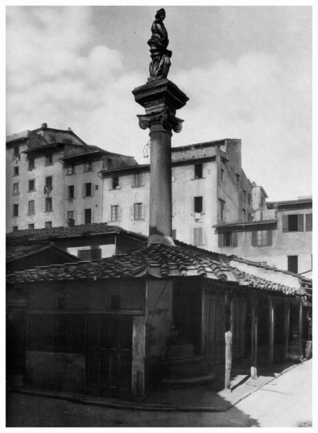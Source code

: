 \documentclass[a4paper,12pt, oneside]{book}
\begin{document}
  \begin{center}
  	\begin{minipage}{0.40\linewidth}
  		\includegraphics[width=\linewidth]{"Immagini/colonna dell'abbondanza prima"}
  		\label{fig:colonna dell'abbondanza prima}
  	\end{minipage}%
  	\hfill
  	\begin{minipage}{0.42\linewidth}

\end{minipage}
\end{center}
\end{document}
